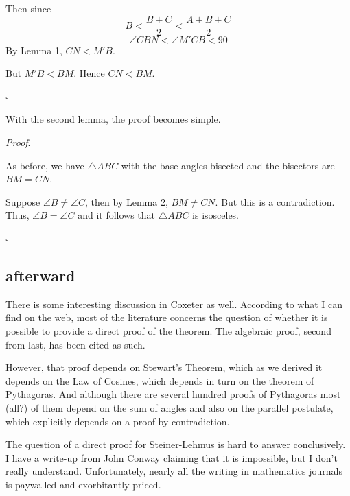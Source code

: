 \documentclass[11pt, oneside]{article}
\begin{document}
Then since 
\[ B < \frac{B + C}{2} < \frac{A + B + C}{2} \]
\[ \angle CBN < \angle M'CB < 90 \]
By Lemma 1, $CN < M'B$.

But $M'B < BM$.  Hence $CN < BM$.  

$\square$

With the second lemma, the proof becomes simple.  

\emph{Proof}.

As before, we have $\triangle ABC$ with the base angles bisected and the bisectors are $BM = CN$.

Suppose $\angle B \ne \angle C$, then by Lemma 2, $BM \ne CN$.  But this is a contradiction.  Thus, $\angle B = \angle C$ and it follows that $\triangle ABC$ is isosceles.

$\square$

\subsection*{afterward}

There is some interesting discussion in Coxeter as well.  According to what I can find on the web, most of the literature concerns the question of whether it is possible to provide a direct proof of the theorem.  The algebraic proof, second from last, has been cited as such.  

However, that proof depends on Stewart's Theorem, which as we derived it depends on the Law of Cosines, which depends in turn on the theorem of Pythagoras.  And although there are several hundred proofs of Pythagoras most (all?) of them depend on the sum of angles and also on the parallel postulate, which explicitly depends on a proof by contradiction.  

The question of a direct proof for Steiner-Lehmus is hard to answer conclusively.  I have a write-up from John Conway claiming that it is impossible, but I don't really understand.  Unfortunately, nearly all the writing in mathematics journals is paywalled and exorbitantly priced.
\end{document}
